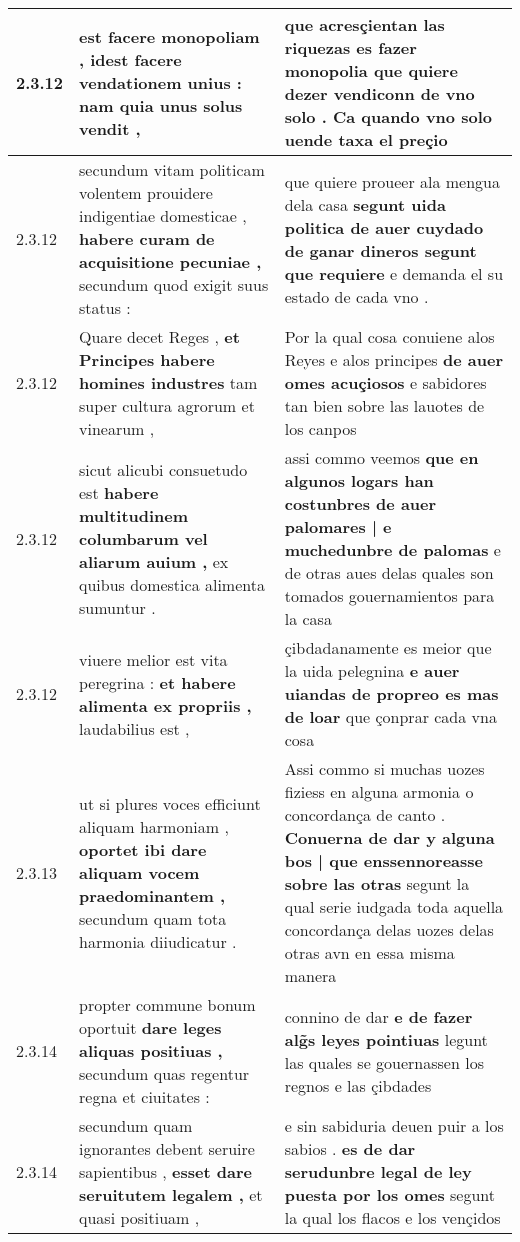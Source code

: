 \begin{tabular}{|p{1cm}|p{6.5cm}|p{6.5cm}|}
2.3.12 & est facere monopoliam , \textbf{ idest facere vendationem unius : } nam quia unus solus vendit , & que acresçientan las riquezas es fazer monopolia \textbf{ que quiere dezer vendiconn de vno solo . } Ca quando vno solo uende taxa el preçio \\\hline
2.3.12 & secundum vitam politicam volentem prouidere indigentiae domesticae , \textbf{ habere curam de acquisitione pecuniae , } secundum quod exigit suus status : & que quiere proueer ala mengua dela casa \textbf{ segunt uida politica de auer cuydado de ganar dineros segunt que requiere } e demanda el su estado de cada vno . \\\hline
2.3.12 & Quare decet Reges , \textbf{ et Principes habere homines industres } tam super cultura agrorum et vinearum , & Por la qual cosa conuiene alos Reyes e alos principes \textbf{ de auer omes acuçiosos } e sabidores tan bien sobre las lauotes de los canpos \\\hline
2.3.12 & sicut alicubi consuetudo est \textbf{ habere multitudinem columbarum vel aliarum auium , } ex quibus domestica alimenta sumuntur . & assi commo veemos \textbf{ que en algunos logars han costunbres de auer palomares | e muchedunbre de palomas } e de otras aues delas quales son tomados gouernamientos para la casa \\\hline
2.3.12 & viuere melior est vita peregrina : \textbf{ et habere alimenta ex propriis , } laudabilius est , & çibdadanamente es meior que la uida pelegnina \textbf{ e auer uiandas de propreo es mas de loar } que çonprar cada vna cosa \\\hline
2.3.13 & ut si plures voces efficiunt aliquam harmoniam , \textbf{ oportet ibi dare aliquam vocem praedominantem , } secundum quam tota harmonia diiudicatur . & Assi commo si muchas uozes fiziess en alguna armonia o concordança de canto . \textbf{ Conuerna de dar y alguna bos | que enssennoreasse sobre las otras } segunt la qual serie iudgada toda aquella concordança delas uozes delas otras avn en essa misma manera \\\hline
2.3.14 & propter commune bonum oportuit \textbf{ dare leges aliquas positiuas , } secundum quas regentur regna et ciuitates : & connino de dar \textbf{ e de fazer alg̃s leyes pointiuas } legunt las quales se gouernassen los regnos e las çibdades \\\hline
2.3.14 & secundum quam ignorantes debent seruire sapientibus , \textbf{ esset dare seruitutem legalem , } et quasi positiuam , & e sin sabiduria deuen puir a los sabios . \textbf{ es de dar serudunbre legal de ley puesta por los omes } segunt la qual los flacos e los vençidos \\\hline

\end{tabular}
